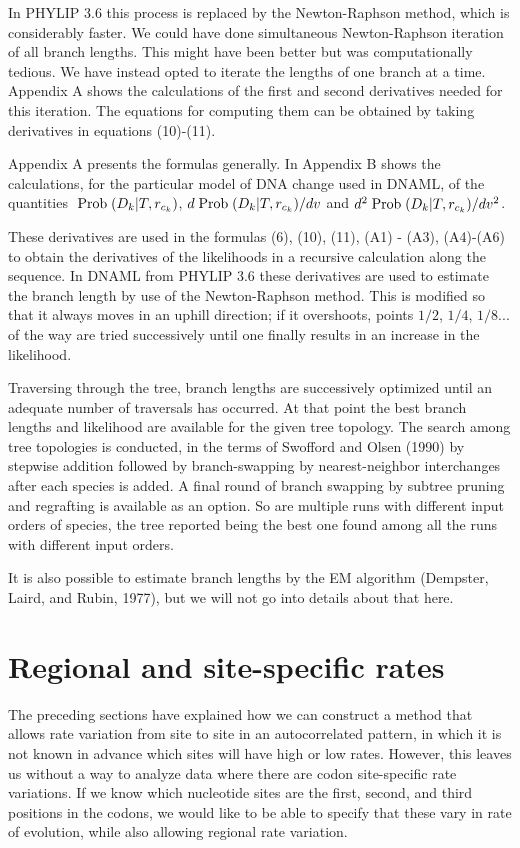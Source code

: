 \documentclass[12pt]{article}
\begin{document}
In PHYLIP 3.6 this process is replaced by the Newton-Raphson method, which is
considerably faster.  We could have done simultaneous Newton-Raphson iteration
of all branch lengths.  This might have been better but was computationally
tedious.  We have instead opted to iterate the lengths of one branch at a
time.  Appendix A shows the calculations of the first and second derivatives
needed for this iteration.  The equations for computing them can be obtained by
taking derivatives in equations (10)-(11).

Appendix A presents the formulas generally.    In Appendix B shows the
calculations, for the particular model of DNA change used in DNAML, of the
quantities ${\rm\;Prob\;}(D_k|T, r_{c_k})$,
$d{\rm\;Prob\;}(D_k|T, r_{c_k})/dv$ and $d^2{\rm\;Prob\;}(D_k|T, r_{c_k}) /dv^2$.

These derivatives are used in the formulas  (6), (10), (11), (A1) - (A3),
(A4)-(A6) to obtain the derivatives of the likelihoods in a recursive
calculation along the sequence.  In DNAML from PHYLIP 3.6 these derivatives
are used to estimate the branch
length by use of the Newton-Raphson method.  This is modified so that it always moves
in an uphill direction; if it overshoots, points $1/2$, $1/4$, $1/8 ... $ of
the way are tried successively until one finally results in an increase in the
likelihood.

Traversing through the tree, branch lengths are successively optimized
until an adequate number of traversals has occurred.  At that point the
best branch lengths and likelihood are available for the given tree topology.
The search among tree topologies is conducted, in the terms of Swofford and
Olsen (1990) by stepwise addition followed by branch-swapping by nearest-neighbor
interchanges after each species is added.  A final round of branch swapping by
subtree pruning and regrafting is available as an option.  So are multiple
runs with different input orders of species, the tree reported being the best
one found among all the runs with different input orders.

It is also possible to estimate branch lengths by the EM algorithm (Dempster,
Laird, and Rubin, 1977), but we will not go into details about that here.


\section*{Regional and site-specific rates}

The preceding sections have explained how we can construct a method that allows
rate variation from site to site in an autocorrelated pattern, in which it is
not known in advance which sites will have high or low rates.  However,
this leaves us without a way to analyze data where there are
codon site-specific rate variations.  If we know which nucleotide sites
are the first, second, and third positions in the codons, we would like to
be able to specify that these vary in rate of evolution, while also allowing
regional rate variation.
\end{document}
